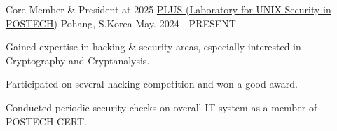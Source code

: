 \begin{cventries}
  \cventry
    {Core Member \& President at 2025} %
    {\href{https://plus.or.kr/}{PLUS (Laboratory for UNIX Security in POSTECH)}} %
    {Pohang, S.Korea} %
    {May. 2024 - PRESENT} %
    {
      \begin{cvitems} %
        \item {Gained expertise in hacking \& security areas, especially interested in Cryptography and Cryptanalysis.}
        \item {Participated on several hacking competition and won a good award.}
        \item {Conducted periodic security checks on overall IT system as a member of POSTECH CERT.}
      \end{cvitems}
    }

\end{cventries}
